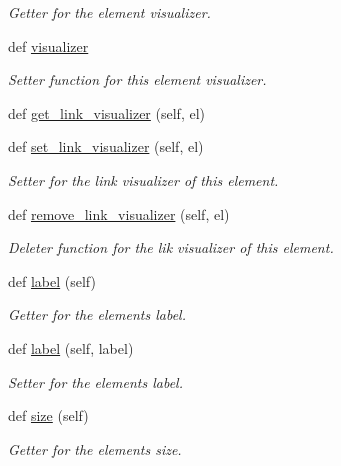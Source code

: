 \begin{DoxyCompactItemize}
\begin{DoxyCompactList}\small\item\em Getter for the element visualizer. \end{DoxyCompactList}\item 
def \hyperlink{classbridges_1_1element_1_1_element_a38aad89ce4b1e01cb9f548cac4313077}{visualizer}
\begin{DoxyCompactList}\small\item\em Setter function for this element visualizer. \end{DoxyCompactList}\item 
def \hyperlink{classbridges_1_1element_1_1_element_af04537af8ad9f64047de96a524c8c1f9}{get\+\_\+link\+\_\+visualizer} (self, el)
\item 
def \hyperlink{classbridges_1_1element_1_1_element_afe94604116e0dec9a60a4ea54a462323}{set\+\_\+link\+\_\+visualizer} (self, el)
\begin{DoxyCompactList}\small\item\em Setter for the link visualizer of this element. \end{DoxyCompactList}\item 
def \hyperlink{classbridges_1_1element_1_1_element_ad2aff75ace2a306deff639b4aa129ce0}{remove\+\_\+link\+\_\+visualizer} (self, el)
\begin{DoxyCompactList}\small\item\em Deleter function for the lik visualizer of this element. \end{DoxyCompactList}\item 
def \hyperlink{classbridges_1_1element_1_1_element_a3cd2f535bb7993254b8d255cb0166062}{label} (self)
\begin{DoxyCompactList}\small\item\em Getter for the element\textquotesingle{}s label. \end{DoxyCompactList}\item 
def \hyperlink{classbridges_1_1element_1_1_element_a29dd33558e94464186658d2baad1d6c9}{label} (self, label)
\begin{DoxyCompactList}\small\item\em Setter for the element\textquotesingle{}s label. \end{DoxyCompactList}\item 
def \hyperlink{classbridges_1_1element_1_1_element_a4d25b09a11a282c8c8147b16cd45c5bf}{size} (self)
\begin{DoxyCompactList}\small\item\em Getter for the element\textquotesingle{}s size. \end{DoxyCompactList}\item 

\end{DoxyCompactItemize}
